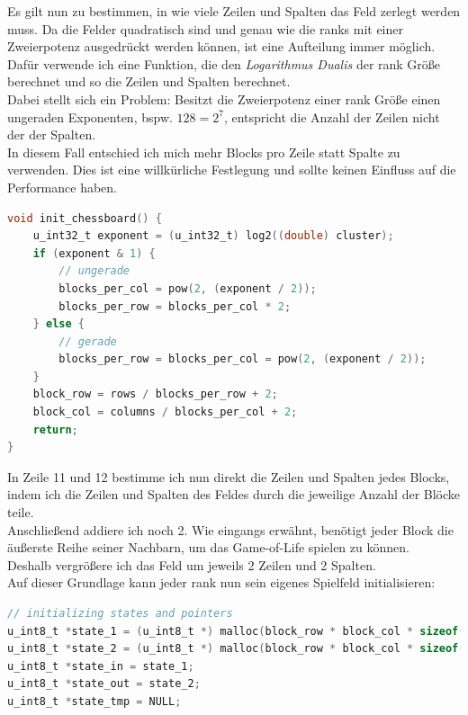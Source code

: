 \documentclass[german,plainarticle,hyperref,utf8]{zihpub}
\begin{document}
	Es gilt nun zu bestimmen, in wie viele Zeilen und Spalten das Feld zerlegt werden muss. Da die Felder quadratisch sind und genau wie die ranks mit einer Zweierpotenz ausgedrückt werden können, ist eine Aufteilung immer möglich.\\
	Dafür verwende ich eine Funktion, die den \textit{Logarithmus Dualis} der rank Größe berechnet und so die Zeilen und Spalten berechnet.\\
	Dabei stellt sich ein Problem: Besitzt die Zweierpotenz einer rank Größe einen ungeraden Exponenten, bspw. $128 = 2^7$, entspricht die Anzahl der Zeilen nicht der der Spalten.\\
	In diesem Fall entschied ich mich mehr Blocks pro Zeile statt Spalte zu verwenden. Dies ist eine willkürliche Festlegung und sollte keinen Einfluss auf die Performance haben.
	\clearpage
	\begin{lstlisting}[language=C, caption=Bestimmung der Zeilen und Spalten des chessboard Layouts]
void init_chessboard() {
	u_int32_t exponent = (u_int32_t) log2((double) cluster);
	if (exponent & 1) {
		// ungerade
		blocks_per_col = pow(2, (exponent / 2));
		blocks_per_row = blocks_per_col * 2;
	} else {
		// gerade
		blocks_per_row = blocks_per_col = pow(2, (exponent / 2));
	}
	block_row = rows / blocks_per_row + 2;
	block_col = columns / blocks_per_col + 2;
	return;
}\end{lstlisting}

	In Zeile 11 und 12 bestimme ich nun direkt die Zeilen und Spalten jedes Blocks, indem ich die Zeilen und Spalten des Feldes durch die jeweilige Anzahl der Blöcke teile.\\
	Anschließend addiere ich noch 2. Wie eingangs erwähnt, benötigt jeder Block die äußerste Reihe seiner Nachbarn, um das Game-of-Life spielen zu können.\\
	Deshalb vergrößere ich das Feld um jeweils 2 Zeilen und 2 Spalten.\\
	
	Auf dieser Grundlage kann jeder rank nun sein eigenes Spielfeld initialisieren:
	\begin{lstlisting}[language=C, caption=Initialisierung der Spielfelder]
// initializing states and pointers
u_int8_t *state_1 = (u_int8_t *) malloc(block_row * block_col * sizeof(u_int8_t));
u_int8_t *state_2 = (u_int8_t *) malloc(block_row * block_col * sizeof(u_int8_t));
u_int8_t *state_in = state_1;
u_int8_t *state_out = state_2;
u_int8_t *state_tmp = NULL;
	\end{lstlisting}
	
\end{document}
